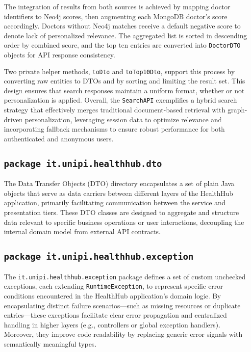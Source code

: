 The integration of results from both sources is achieved by mapping doctor identifiers to Neo4j scores, then augmenting each MongoDB doctor's score accordingly. Doctors without Neo4j matches receive a default negative score to denote lack of personalized relevance. The aggregated list is sorted in descending order by combined score, and the top ten entries are converted into \texttt{DoctorDTO} objects for API response consistency.

Two private helper methods, \texttt{toDto} and \texttt{toTop10Dto}, support this process by converting raw entities to DTOs and by sorting and limiting the result set. This design ensures that search responses maintain a uniform format, whether or not personalization is applied. Overall, the \texttt{SearchAPI} exemplifies a hybrid search strategy that effectively merges traditional document-based retrieval with graph-driven personalization, leveraging session data to optimize relevance and incorporating fallback mechanisms to ensure robust performance for both authenticated and anonymous users.

\subsection{\texttt{package it.unipi.healthhub.dto}}
The Data Transfer Objects (DTO) directory encapsulates a set of plain Java objects that serve as data carriers between different layers of the HealthHub application, primarily facilitating communication between the service and presentation tiers. These DTO classes are designed to aggregate and structure data relevant to specific business operations or user interactions, decoupling the internal domain model from external API contracts.

\subsection{\texttt{package it.unipi.healthhub.exception}}
The \texttt{it.unipi.healthhub.exception} package defines a set of custom unchecked exceptions, each extending \texttt{RuntimeException}, to represent specific error conditions encountered in the HealthHub application’s domain logic. By encapsulating distinct failure scenarios—such as missing resources or duplicate entries—these exceptions facilitate clear error propagation and centralized handling in higher layers (e.g., controllers or global exception handlers). Moreover, they improve code readability by replacing generic error signals with semantically meaningful types.

